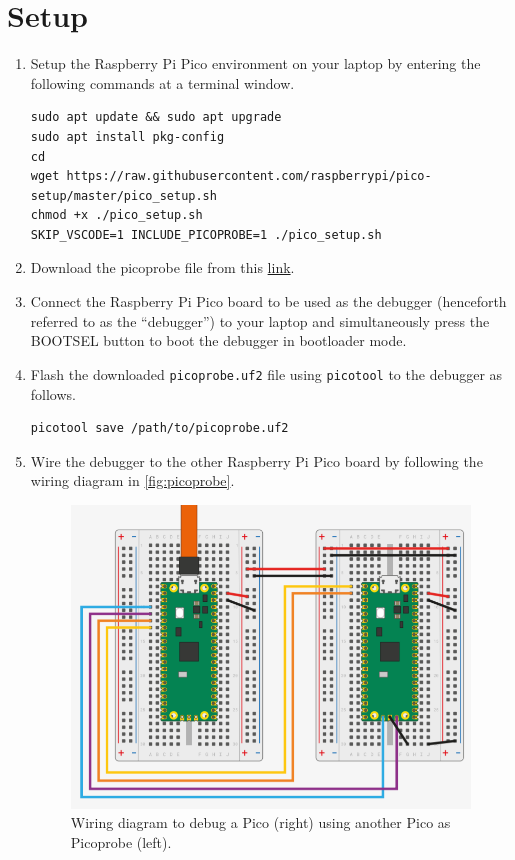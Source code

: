 \section{Setup}
\begin{enumerate}
    \item Setup the Raspberry Pi Pico environment on your laptop by entering the
    following commands at a terminal window.

    \begin{lstlisting}
sudo apt update && sudo apt upgrade
sudo apt install pkg-config
cd
wget https://raw.githubusercontent.com/raspberrypi/pico-setup/master/pico_setup.sh
chmod +x ./pico_setup.sh
SKIP_VSCODE=1 INCLUDE_PICOPROBE=1 ./pico_setup.sh
    \end{lstlisting}

    \item Download the picoprobe file from this 
    \href{https://www.raspberrypi.com/documentation/microcontrollers/raspberry-pi-pico.html#debugging-using-another-raspberry-pi-pico}{link}.
    \item Connect the Raspberry Pi Pico board to be used as the debugger
    (henceforth referred to as the ``debugger'') to your laptop and
    simultaneously press the BOOTSEL button to boot the debugger in bootloader
    mode.
    \item Flash the downloaded \texttt{picoprobe.uf2} file using
    \texttt{picotool} to the debugger as follows.
    \begin{lstlisting}
picotool save /path/to/picoprobe.uf2
    \end{lstlisting}
    \item Wire the debugger to the other Raspberry Pi Pico board by following
    the wiring diagram in \autoref{fig:picoprobe}.
    \begin{figure}[!ht]
        \includegraphics[width=\columnwidth]{picoprobe/figs/picoprobe.png}
        \caption{Wiring diagram to debug a Pico (right) using another Pico as Picoprobe (left).}
        \label{fig:picoprobe}
    \end{figure}
\end{enumerate}


